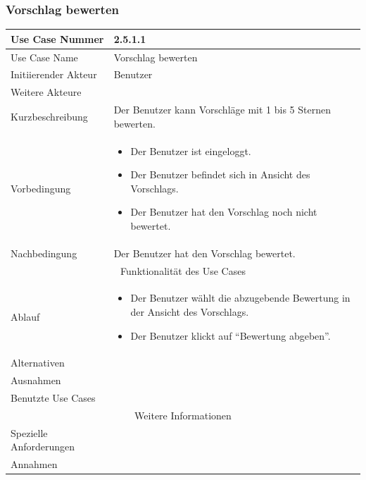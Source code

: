 \documentclass[10pt,a4paper]{article}
\begin{document}
\subsubsection{Vorschlag bewerten}
	\begin{tabularx}{\textwidth}{|l|X|}
	\hline Use Case Nummer & 2.5.1.1 \\ 
	\hline Use Case Name & Vorschlag bewerten \\ 
	\hline Initiierender Akteur & Benutzer \\
	\hline Weitere Akteure &  \\
	\hline Kurzbeschreibung & Der Benutzer kann Vorschl\"age mit 1 bis 5 Sternen bewerten. \\
	\hline Vorbedingung & \begin{itemize}
        	\item Der Benutzer ist eingeloggt.
                \item Der Benutzer befindet sich in Ansicht des Vorschlags.
                \item Der Benutzer hat den Vorschlag noch nicht bewertet.
                \end{itemize} \\
	\hline Nachbedingung & Der Benutzer hat den Vorschlag bewertet. \\
	\hline \multicolumn{2}{|c|}{Funktionalität des Use Cases}\\
	\hline Ablauf & \begin{itemize}
		\item Der Benutzer w\"ahlt die abzugebende Bewertung in der Ansicht des Vorschlags.
		\item Der Benutzer klickt auf ``Bewertung abgeben''.
	\end{itemize} \\
	\hline Alternativen &  \\
	\hline Ausnahmen &  \\
	\hline Benutzte Use Cases &  \\
	\hline \multicolumn{2}{|c|}{Weitere Informationen} \\
	\hline Spezielle Anforderungen &  \\
	\hline Annahmen &  \\
	\hline
	\end{tabularx}
\end{document}

